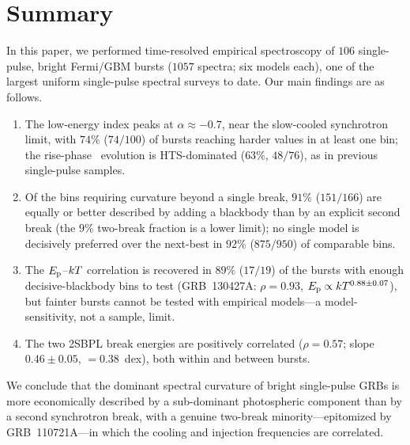 \section{Summary} \label{sec:summary}
In this paper, we performed time-resolved empirical spectroscopy of $106$
single-pulse, bright Fermi/GBM bursts ($1057$ spectra; six models each), one
of the largest uniform single-pulse spectral surveys to date. Our main findings
are as follows.
\begin{enumerate}
\item The low-energy index peaks at $\alpha\approx-0.7$, near the slow-cooled
  synchrotron limit, with $74\%$ ($74/100$) of bursts reaching harder values in
  at least one bin; the rise-phase \Ep\ evolution is HTS-dominated
  ($63\%$, $48/76$), as in previous single-pulse samples.
\item Of the bins requiring curvature beyond a single break, $91\%$ ($151/166$)
  are equally or better described by adding a blackbody than by an explicit
  second break (the $9\%$ two-break fraction is a lower limit); no single model
  is decisively preferred over the next-best in $92\%$ ($875/950$) of
  comparable bins.
\item The \citet{Burgess2014a} $E_{\rm p}$--$kT$ correlation is recovered in $89\%$
  ($17/19$) of the bursts with enough decisive-blackbody bins to test
  (GRB~130427A: $\rho=0.93$, $E_{\rm p}\propto kT^{0.88\pm0.07}$), but fainter bursts
  cannot be tested with empirical models---a model-sensitivity, not a sample,
  limit.
\item The two 2SBPL break energies are positively correlated ($\rho=0.57$;
  \citealt{DAgostini2005} slope $0.46\pm0.05$, \ssc$=0.38$~dex), both within
  and between bursts.
\end{enumerate}
We conclude that the dominant spectral curvature of bright single-pulse GRBs is
more economically described by a sub-dominant photospheric component than by a
second synchrotron break, with a genuine two-break minority---epitomized by
GRB~110721A---in which the cooling and injection frequencies are correlated.

